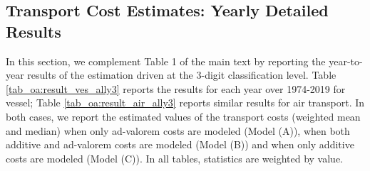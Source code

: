 \documentclass[11pt,twoside, authoryear]{elsarticle}
\begin{document}
\newpage


\newpage
\setcounter{table}{0}
\renewcommand{\thetable}{C.\arabic{table}}

\subsection{Transport Cost Estimates: Yearly Detailed Results \label{secoa:yearly_results}}

In this section, we complement Table 1 of the main text by reporting the year-to-year results of the estimation driven at the 3-digit classification level. Table \ref{tab_oa:result_ves_ally3} reports the results for each year over 1974-2019 for vessel; Table \ref{tab_oa:result_air_ally3} reports similar results for air transport. In both cases, we report the estimated values of the transport costs (weighted mean and median) when only ad-valorem costs are modeled (Model (A)), when both additive and ad-valorem costs are modeled (Model (B)) and when only additive costs are modeled (Model (C)). In all tables, statistics are weighted by value.
\end{document}
